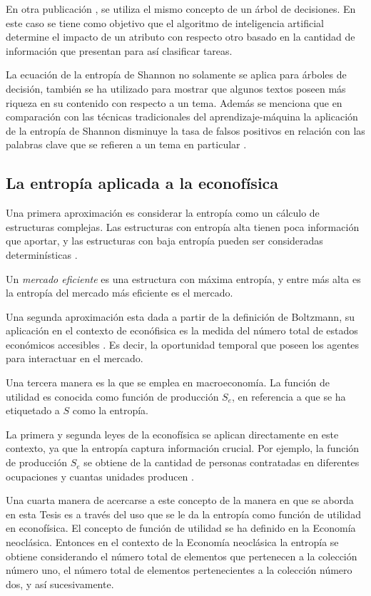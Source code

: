 En otra publicación \citep{dos2012entropy}  , se utiliza el mismo concepto de un árbol de decisiones. 
En este caso se tiene como objetivo que el algoritmo de inteligencia artificial determine el impacto de un atributo con respecto otro basado en la cantidad de información que presentan para así clasificar tareas. 

La ecuación de la entropía de Shannon no solamente se aplica para árboles de decisión, también se ha utilizado para mostrar que algunos textos poseen más riqueza en su contenido con respecto a un tema. 
Además se menciona que en comparación con las técnicas tradicionales del aprendizaje-máquina la aplicación de la entropía de Shannon disminuye la tasa de falsos positivos en relación con las palabras clave que se refieren a un tema en particular \citep[][]{chan2022knowledge}.   
 
\subsection{La entropía aplicada a la econofísica}

Una primera aproximación es considerar la entropía como un cálculo de estructuras complejas. Las estructuras con entropía alta tienen poca información que aportar, y las estructuras con baja entropía pueden ser consideradas determinísticas \citep[][]{pincus2004irregularity}.

Un \textit{mercado eficiente} es una estructura con máxima entropía, y entre más alta es la entropía del mercado más eficiente es el mercado.

Una segunda aproximación esta dada a partir de la definición de Boltzmann, su aplicación en el contexto de econófisica es la medida del número total de estados económicos accesibles \citep[][]{richmond}. Es decir, la oportunidad temporal que poseen los agentes para interactuar en el mercado.

Una tercera manera es la que se emplea en macroeconomía. La función de utilidad es conocida como función de producción $S_e$, en referencia a que se ha etiquetado a $S$ como la entropía. 

La primera y segunda leyes de la econofísica se aplican directamente en este contexto, ya que la entropía captura información crucial. Por ejemplo, la función de producción $S_e$ se obtiene de la cantidad de personas contratadas en diferentes ocupaciones y cuantas unidades producen \citep[][pagina 170]{richmond}. 

Una cuarta manera de acercarse a este concepto de la manera en que se aborda en esta Tesis es a través del uso que se le da la entropía como función de utilidad en econofísica. El concepto de función de utilidad se ha definido en la Economía neoclásica. Entonces en el contexto de la Economía neoclásica la entropía se obtiene considerando el número total de elementos que pertenecen a la colección número uno, el número total de elementos pertenecientes a la colección número dos, y así sucesivamente. 


